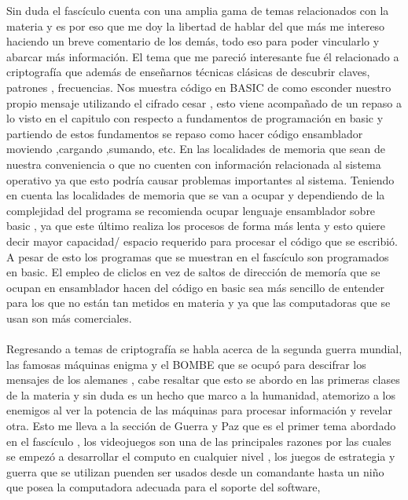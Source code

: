 \documentclass[a4paper, 12pt]{article}
\begin{document}
Sin duda el fasc\'iculo cuenta con una amplia gama de temas relacionados con la materia y es por eso que me doy la libertad de hablar del que m\'as me intereso haciendo un breve comentario de los dem\'as, todo eso para poder vincularlo y abarcar m\'as informaci\'on. El tema que me pareci\'o interesante fue \'el relacionado a criptograf\'ia que adem\'as de ense\~narnos t\'ecnicas cl\'asicas de descubrir claves, patrones , frecuencias. Nos muestra c\'odigo en BASIC de como esconder nuestro propio mensaje utilizando el cifrado cesar , esto viene acompa\~nado de un repaso a lo visto en el capitulo con respecto a fundamentos de programaci\'on en basic y partiendo de estos fundamentos se repaso como hacer c\'odigo ensamblador moviendo ,cargando ,sumando, etc. En las localidades de memoria que sean de nuestra conveniencia  o que no cuenten con informaci\'on relacionada al sistema operativo ya que esto podr\'ia causar problemas importantes al sistema. Teniendo en cuenta las localidades de memoria que se van a ocupar y dependiendo de la complejidad del programa se recomienda ocupar lenguaje ensamblador sobre basic , ya que este \'ultimo realiza los procesos de forma m\'as lenta y esto quiere decir mayor capacidad/ espacio requerido para procesar el c\'odigo que se escribi\'o. A pesar de esto los programas que se muestran en el fasc\'iculo son programados en basic. El empleo de cliclos en vez de saltos de direcci\'on de memor\'ia que se ocupan en ensamblador hacen del c\'odigo en basic sea m\'as sencillo de entender para los que no est\'an tan metidos en materia y ya que las computadoras que se usan son m\'as comerciales. 
\\ \\
Regresando a temas de criptograf\'ia se habla acerca de la segunda guerra mundial,  las famosas m\'aquinas enigma y el BOMBE que se ocup\'o para descifrar los mensajes de los alemanes , cabe resaltar que esto se abordo en las primeras clases de la materia y sin duda es un hecho que marco a la humanidad, atemorizo a los enemigos al ver la potencia de las m\'aquinas para procesar informaci\'on y revelar otra. Esto me lleva a la secci\'on de Guerra y Paz que es el primer tema abordado en el fasc\'iculo , los videojuegos son una de las principales razones por las cuales se empez\'o a desarrollar el computo en cualquier nivel , los juegos de estrategia y guerra que se utilizan puenden ser usados desde un comandante hasta un ni\~no que posea la computadora adecuada para el soporte del software, 
\\ \\
\end{document}

